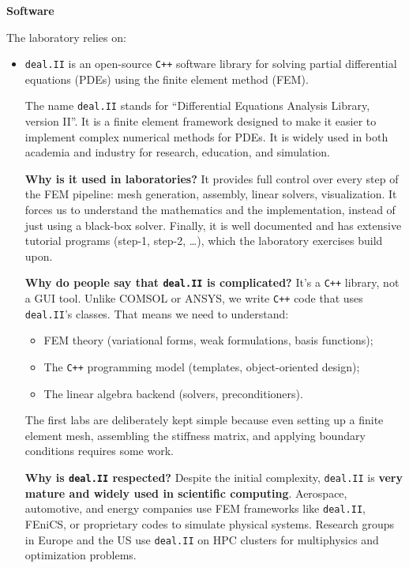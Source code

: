 \highspace
\begin{flushleft}
    \textcolor{Green3}{ \textbf{Software}}
\end{flushleft}
The laboratory relies on:
\begin{itemize}
    \item \texttt{deal.II} is an open-source \texttt{C++} software library for solving partial differential equations (PDEs) using the finite element method (FEM). 
    
    The name \texttt{deal.II} stands for ``Differential Equations Analysis Library, version II''. It is a finite element framework designed to make it easier to implement complex numerical methods for PDEs. It is widely used in both academia and industry for research, education, and simulation.

    \textcolor{Green3}{ \textbf{Why is it used in laboratories?}} It provides full control over every step of the FEM pipeline: mesh generation, assembly, linear solvers, visualization. It forces us to understand the mathematics and the implementation, instead of just using a black-box solver. Finally, it is well documented and has extensive tutorial programs (step-1, step-2, …), which the laboratory exercises build upon.

    \textcolor{Green3}{ \textbf{Why do people say that \texttt{deal.II} is complicated?}} It's a \texttt{C++} library, not a GUI tool. Unlike COMSOL or ANSYS, we write \texttt{C++} code that uses \texttt{deal.II}'s classes. That means we need to understand:
    \begin{itemize}
        \item FEM theory (variational forms, weak formulations, basis functions);
        \item The \texttt{C++} programming model (templates, object-oriented design);
        \item The linear algebra backend (solvers, preconditioners).
    \end{itemize}
    The first labs are deliberately kept simple because even setting up a finite element mesh, assembling the stiffness matrix, and applying boundary conditions requires some work.

    \textcolor{Green3}{ \textbf{Why is \texttt{deal.II} respected?}} Despite the initial complexity, \texttt{deal.II} is \textbf{very mature and widely used in scientific computing}. Aerospace, automotive, and energy companies use FEM frameworks like \texttt{deal.II}, FEniCS, or proprietary codes to simulate physical systems. Research groups in Europe and the US use \texttt{deal.II} on HPC clusters for multiphysics and optimization problems.



\end{itemize}
